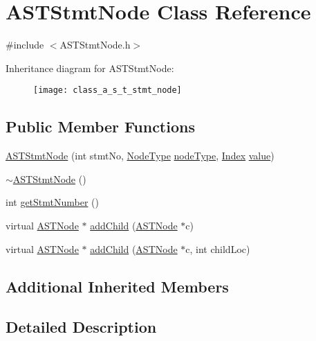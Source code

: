 \hypertarget{class_a_s_t_stmt_node}{\section{A\-S\-T\-Stmt\-Node Class Reference}
\label{class_a_s_t_stmt_node}
}


{\ttfamily \#include $<$A\-S\-T\-Stmt\-Node.\-h$>$}

Inheritance diagram for A\-S\-T\-Stmt\-Node\-:\begin{figure}[H]
\begin{center}
\leavevmode
\texttt{[image: class\_a\_s\_t\_stmt\_node]}
\end{center}
\end{figure}
\subsection*{Public Member Functions}
\begin{DoxyCompactItemize}
\item 
\hyperlink{class_a_s_t_stmt_node_abf3ac4ab701786816ee76defcdb3c328}{A\-S\-T\-Stmt\-Node} (int stmt\-No, \hyperlink{class_a_s_t_node_a4fd016b5f0e44ea6aca3542d27de3859}{Node\-Type} \hyperlink{class_a_s_t_node_a15fcdbd8403a1169b06d948a827fde55}{node\-Type}, \hyperlink{_a_s_t_stmt_node_8h_a4a0e50e01fef3e431767a928c2631cab}{Index} \hyperlink{class_a_s_t_node_a136d1712e8cfdeb4908aceb22abc3de7}{value})
\item 
\hyperlink{class_a_s_t_stmt_node_ac80a1656c17e5e55dff7285fd37dc313}{$\sim$\-A\-S\-T\-Stmt\-Node} ()
\item 
int \hyperlink{class_a_s_t_stmt_node_a7ccabe8c03f4ba0eb31ac4850725c4e2}{get\-Stmt\-Number} ()
\item 
virtual \hyperlink{class_a_s_t_node}{A\-S\-T\-Node} $\ast$ \hyperlink{class_a_s_t_stmt_node_a0396498d6bbccecd8a71a4251d237380}{add\-Child} (\hyperlink{class_a_s_t_node}{A\-S\-T\-Node} $\ast$c)
\item 
virtual \hyperlink{class_a_s_t_node}{A\-S\-T\-Node} $\ast$ \hyperlink{class_a_s_t_stmt_node_aa265b32dab6bb7fcb8b7f1e8a9687f9a}{add\-Child} (\hyperlink{class_a_s_t_node}{A\-S\-T\-Node} $\ast$c, int child\-Loc)
\end{DoxyCompactItemize}
\subsection*{Additional Inherited Members}


\subsection{Detailed Description}


